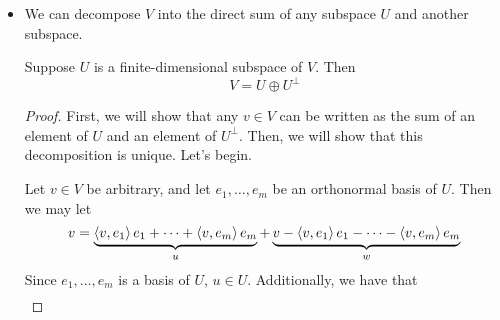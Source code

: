 \documentclass[../main.tex]{subfiles}
\begin{document}
\begin{itemize}
\begin{theorem}
\begin{enumerate}[label={\textup{(}\alph*\textup{)}},ref={\thetheorem\alph*}]
            \begin{proof}
                Suppose $v\in V^\perp$. Then $\inp{v}{u}=0$ for all $u\in V$. In particular, $\inp{v}{v}=0$. But this implies that $v=0$ by the definiteness of the inner product. Therefore, $V^\perp=\{0\}$.
            \end{proof}
            \item \label{trm:perpPropertiesd}If $U$ is a subset of $V$, then $U\cap U^\perp\subset\{0\}$.
            \begin{proof}
                Let $v\in U\cap U^\perp$. Then $\inp{v}{v}=0$. Therefore, $U\cap U^\perp\subset\{0\}$.
            \end{proof}
            \item \label{trm:perpPropertiese}If $U$ and $W$ are subsets of $V$ and $U\subset W$, then $W^\perp\subset U^\perp$.
            \begin{proof}
                Let $v\in W^\perp$. Then $\inp{v}{u}=0$ for all $u\in W$. But since $U\subset W$, this implies that $\inp{v}{u}=0$ for all $u\in U$. Thus, $v\in U^\perp$. Therefore, $W^\perp\subset U^\perp$.
            \end{proof}
        \end{enumerate}
    \end{theorem}
    \item We can decompose $V$ into the direct sum of any subspace $U$ and another subspace.
    \begin{theorem}\label{trm:perpDirectSum}
        Suppose $U$ is a finite-dimensional subspace of $V$. Then
        \begin{equation*}
            V = U\oplus U^\perp
        \end{equation*}
        \begin{proof}
            First, we will show that any $v\in V$ can be written as the sum of an element of $U$ and an element of $U^\perp$. Then, we will show that this decomposition is unique. Let's begin.\par
            Let $v\in V$ be arbitrary, and let $e_1,\dots,e_m$ be an orthonormal basis of $U$. Then we may let
            \begin{equation*}
                v = \underbrace{\left\langle{v},{e_1}\right\rangle e_1+\cdots+\left\langle{v},{e_m}\right\rangle e_m}_u+\underbrace{v-\left\langle{v},{e_1}\right\rangle e_1-\cdots-\left\langle{v},{e_m}\right\rangle e_m}_w
            \end{equation*}
            Since $e_1,\dots,e_m$ is a basis of $U$, $u\in U$. Additionally, we have that
            \begin{align*}

\end{align*}
\end{proof}
\end{theorem}
\end{itemize}
\end{document}

